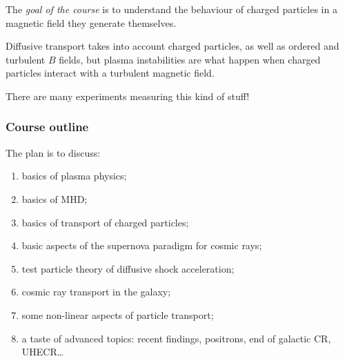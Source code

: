 \documentclass[main.tex]{subfiles}
\begin{document}
The \emph{goal of the course} is to understand the behaviour of 
charged particles in a magnetic field they generate themselves. 

Diffusive transport  takes into account charged particles, as well 
as ordered and turbulent \(B\) fields, but 
plasma instabilities are what happen when charged particles interact with a 
turbulent magnetic field. 

There are many experiments measuring this kind of stuff! 

\subsubsection{Course outline}

The plan is to discuss:
\begin{enumerate}
    \item basics of plasma physics;
    \item basics of MHD;
    \item basics of transport of charged particles;
    \item basic aspects of the supernova paradigm for cosmic rays;
    \item test particle theory of diffusive shock acceleration;
    \item cosmic ray transport in the galaxy;
    \item some non-linear aspects of particle transport;
    \item a taste of advanced topics: 
        recent findings, positrons, end of galactic CR, UHECR\dots
\end{enumerate}
\end{document}
